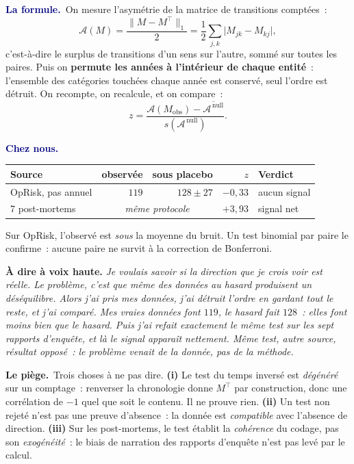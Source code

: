 \documentclass[11pt,a4paper]{article}
\newcommand{\laformule}[1]{\smallskip\noindent\textcolor{navy}{\textbf{La formule.}}\ #1\par}
\newcommand{\cheznous}[1]{\smallskip\noindent\textcolor{navy}{\textbf{Chez nous.}}\ #1\par}
\newcommand{\lepiege}[1]{\smallskip\noindent\textcolor{accent}{\textbf{Le piège.}}\ #1\par}
\newcommand{\laphrase}[1]{\begin{phrasebox}\textbf{À dire à voix haute.} \emph{#1}\end{phrasebox}}
\begin{document}
\laformule{On mesure l'asymétrie de la matrice de transitions comptées~:
\[
  \mathcal{A}(M)=\frac{\|M-M^{\top}\|_1}{2}
  =\frac12\sum_{j,k}\bigl|M_{jk}-M_{kj}\bigr| ,
\]
c'est-à-dire le surplus de transitions d'un sens sur l'autre, sommé sur toutes les paires.
Puis on \textbf{permute les années à l'intérieur de chaque entité}~: l'ensemble des
catégories touchées chaque année est conservé, seul l'ordre est détruit. On recompte, on
recalcule, et on compare~:
\[
  z=\frac{\mathcal{A}(M_{\text{obs}})-\overline{\mathcal{A}^{\,\text{null}}}}
        {\widehat{s}(\mathcal{A}^{\,\text{null}})} .
\]}

\cheznous{
\begin{center}\small
\begin{tabular}{@{}l r r r l@{}}
\toprule
\textbf{Source} & \textbf{observée} & \textbf{sous placebo} & \textbf{$z$} & \textbf{Verdict}\\
\midrule
OpRisk, pas annuel & $119$ & $128\pm27$ & $-0{,}33$ & aucun signal \\
7 post-mortems & \multicolumn{2}{c}{\emph{même protocole}} & $+3{,}93$ & signal net \\
\bottomrule
\end{tabular}
\end{center}
Sur OpRisk, l'observé est \emph{sous} la moyenne du bruit. Un test binomial par paire le
confirme~: aucune paire ne survit à la correction de Bonferroni.}

\laphrase{Je voulais savoir si la direction que je crois voir est réelle. Le problème, c'est
que même des données au hasard produisent un déséquilibre. Alors j'ai pris mes données, j'ai
détruit l'ordre en gardant tout le reste, et j'ai comparé. Mes vraies données font
$119$, le hasard fait $128$~: elles font moins bien que le hasard. Puis j'ai refait
exactement le même test sur les sept rapports d'enquête, et là le signal apparaît nettement.
Même test, autre source, résultat opposé~: le problème venait de la donnée, pas de la
méthode.}

\lepiege{Trois choses à ne pas dire. \textbf{(i)} Le test du \og temps inversé\fg{} est
\emph{dégénéré} sur un comptage~: renverser la chronologie donne $M^{\top}$ par
construction, donc une corrélation de $-1$ quel que soit le contenu. Il ne prouve rien.
\textbf{(ii)} Un test non rejeté n'est pas une preuve d'absence~: la donnée est
\emph{compatible} avec l'absence de direction. \textbf{(iii)} Sur les post-mortems, le test
établit la \emph{cohérence} du codage, pas son \emph{exogénéité}~: le biais de narration des
rapports d'enquête n'est pas levé par le calcul.}
\end{document}
